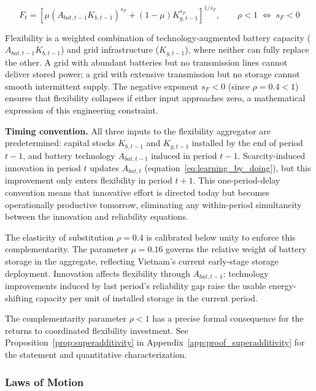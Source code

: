 \documentclass[12pt, a4paper]{article}
\begin{document}
	\begin{equation}
		F_t =
		\left[
		\mu (A_{bat,t-1} K_{b,t-1})^{s_F}
		+
		(1-\mu) K_{g,t-1}^{s_F}
		\right]^{1/s_F},
		\qquad \rho < 1 \;\Leftrightarrow\; s_F < 0
		\label{eq:flexibility_bundle}
	\end{equation}
	
	Flexibility is a weighted combination of technology-augmented battery capacity ($A_{bat,t-1} K_{b,t-1}$) and grid infrastructure ($K_{g,t-1}$), where neither can fully replace the other. A grid with abundant batteries but no transmission lines cannot deliver stored power; a grid with extensive transmission but no storage cannot smooth intermittent supply. The negative exponent $s_F < 0$ (since $\rho = 0.4 < 1$) ensures that flexibility collapses if either input approaches zero, a mathematical expression of this engineering constraint.
	
	\textbf{Timing convention.} All three inputs to the flexibility aggregator are predetermined: capital stocks $K_{b,t-1}$ and $K_{g,t-1}$ installed by the end of period $t-1$, and battery technology $A_{bat,t-1}$ induced in period $t-1$. Scarcity-induced innovation in period $t$ updates $A_{bat,t}$ (equation~\ref{eq:learning_by_doing}), but this improvement only enters flexibility in period $t+1$. This one-period-delay convention means that innovative effort is directed today but becomes operationally productive tomorrow, eliminating any within-period simultaneity between the innovation and reliability equations.
	
	The elasticity of substitution $\rho = 0.4$ is calibrated below unity to enforce this complementarity. The parameter $\mu = 0.16$ governs the relative weight of battery storage in the aggregate, reflecting Vietnam's current early-stage storage deployment. Innovation affects flexibility through $A_{bat,t-1}$: technology improvements induced by last period's reliability gap raise the usable energy-shifting capacity per unit of installed storage in the current period.
	
	The complementarity parameter $\rho < 1$ has a precise formal consequence for the returns to coordinated flexibility investment. See Proposition~\ref{prop:superadditivity} in Appendix~\ref{app:proof_superadditivity} for the statement and quantitative characterization.
	
	\subsubsection{Laws of Motion}
	
\end{document}

